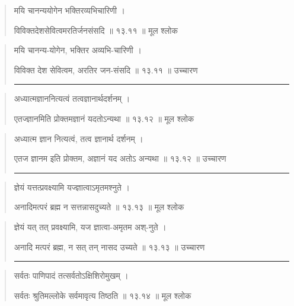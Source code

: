 \begin{quotation}

मयि चानन्ययोगेन भक्तिरव्यभिचारिणी  ।  

विविक्तदेशसेवित्वमरतिर्जनसंसदि  ॥ १३.११ ॥  मूल श्लोक
\end{quotation}

\begin{quotation}
मयि चानन्य-योगेन, भक्तिर अव्यभि-चारिणी  ।  

विविक्त देश सेवित्वम, अरतिर जन-संसदि  ॥ १३.११ ॥  उच्चारण

\noindent\rule{16cm}{0.4pt} 
\end{quotation}


\begin{quotation}

अध्यात्मज्ञाननित्यत्वं तत्वज्ञानार्थदर्शनम्‌  ।  

एतज्ज्ञानमिति प्रोक्तमज्ञानं यदतोऽन्यथा  ॥ १३.१२ ॥  मूल श्लोक
\end{quotation}

\begin{quotation}

अध्यात्म ज्ञान नित्यत्वं, तत्व ज्ञानार्थ दर्शनम्‌  ।  

एतज ज्ञानम इति प्रोक्तम, अज्ञानं यद अतोऽ अन्यथा  ॥ १३.१२ ॥  उच्चारण

\noindent\rule{16cm}{0.4pt} 
\end{quotation}


\begin{quotation}

ज्ञेयं यत्तत्प्रवक्ष्यामि यज्ज्ञात्वाऽमृतमश्नुते ।  

अनादिमत्परं ब्रह्म न सत्तन्नासदुच्यते  ॥ १३.१३ ॥  मूल श्लोक
\end{quotation}

\begin{quotation}

ज्ञेयं यत् तत् प्रवक्ष्यामि, यज ज्ञात्वा-अमृतम अश्-नुते  ।  

अनादि मत्परं ब्रह्म, न सत् तन् नासद उच्यते  ॥ १३.१३ ॥  उच्चारण

\noindent\rule{16cm}{0.4pt} 
\end{quotation}


\begin{quotation}

सर्वतः पाणिपादं तत्सर्वतोऽक्षिशिरोमुखम्‌  ।  

सर्वतः श्रुतिमल्लोके सर्वमावृत्य तिष्ठति  ॥ १३.१४ ॥  मूल श्लोक
\end{quotation}

